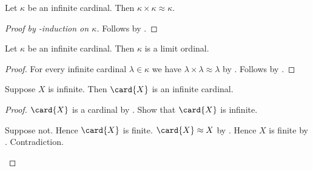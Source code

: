 \begin{theorem}\label{infinite_cardinal_square}
    Let $\kappa$ be an infinite cardinal.
    Then $\kappa\times\kappa\approx\kappa$.
\end{theorem}
\begin{proof}[Proof by \in-induction on $\kappa$]
    Follows by .
\end{proof}

\begin{classification}\label{infinite_cardinal_is_limit_ordinal}
    Let $\kappa$ be an infinite cardinal.
    Then $\kappa$ is a limit ordinal.
\end{classification}
\begin{proof}
    For every infinite cardinal $\lambda\in\kappa$ we have
        $\lambda\times\lambda\approx\lambda$
        by .
    Follows by .
\end{proof}

\begin{proposition}\label{card_of_infinite_set_is_infinite_cardinal}
    Suppose $X$ is infinite.
    Then $\card{X}$ is an infinite cardinal.
\end{proposition}
\begin{proof}
    $\card{X}$ is a cardinal by .
    Show that $\card{X}$ is infinite.
    \begin{subproof}
        Suppose not.
        Hence $\card{X}$ is finite.
        $\card{X}\approx X$ by .
        Hence $X$ is finite by .
        Contradiction.
    \end{subproof}
\end{proof}

